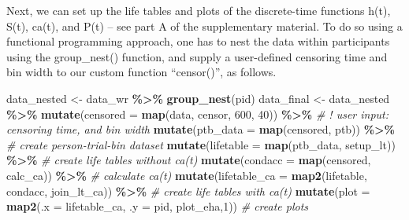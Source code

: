 \documentclass[
  man,floatsintext]{apa6}
\newenvironment{Shaded}{\begin{snugshade}}{\end{snugshade}}
\newcommand{\AttributeTok}[1]{\textcolor[rgb]{0.13,0.29,0.53}{#1}}
\newcommand{\CommentTok}[1]{\textcolor[rgb]{0.56,0.35,0.01}{\textit{#1}}}
\newcommand{\DecValTok}[1]{\textcolor[rgb]{0.00,0.00,0.81}{#1}}
\newcommand{\FunctionTok}[1]{\textcolor[rgb]{0.13,0.29,0.53}{\textbf{#1}}}
\newcommand{\NormalTok}[1]{#1}
\newcommand{\OtherTok}[1]{\textcolor[rgb]{0.56,0.35,0.01}{#1}}
\newcommand{\SpecialCharTok}[1]{\textcolor[rgb]{0.81,0.36,0.00}{\textbf{#1}}}
\begin{document}
\normalsize

Next, we can set up the life tables and plots of the discrete-time functions h(t), S(t), ca(t), and P(t) -- see part A of the supplementary material. To do so using a functional programming approach, one has to nest the data within participants using the group\_nest() function, and supply a user-defined censoring time and bin width to our custom function ``censor()'', as follows.

\scriptsize

\begin{Shaded}
\begin{Highlighting}[]
\NormalTok{data\_nested }\OtherTok{\textless{}{-}}\NormalTok{ data\_wr }\SpecialCharTok{\%\textgreater{}\%} \FunctionTok{group\_nest}\NormalTok{(pid)}
\NormalTok{data\_final }\OtherTok{\textless{}{-}}\NormalTok{ data\_nested }\SpecialCharTok{\%\textgreater{}\%} 
  \FunctionTok{mutate}\NormalTok{(}\AttributeTok{censored  =} \FunctionTok{map}\NormalTok{(data, censor, }\DecValTok{600}\NormalTok{, }\DecValTok{40}\NormalTok{)) }\SpecialCharTok{\%\textgreater{}\%}   \CommentTok{\# ! user input: censoring time, and bin width}
  \FunctionTok{mutate}\NormalTok{(}\AttributeTok{ptb\_data  =} \FunctionTok{map}\NormalTok{(censored, ptb)) }\SpecialCharTok{\%\textgreater{}\%}           \CommentTok{\# create person{-}trial{-}bin dataset}
  \FunctionTok{mutate}\NormalTok{(}\AttributeTok{lifetable =} \FunctionTok{map}\NormalTok{(ptb\_data, setup\_lt)) }\SpecialCharTok{\%\textgreater{}\%}      \CommentTok{\# create life tables without ca(t)}
  \FunctionTok{mutate}\NormalTok{(}\AttributeTok{condacc   =} \FunctionTok{map}\NormalTok{(censored, calc\_ca)) }\SpecialCharTok{\%\textgreater{}\%}       \CommentTok{\# calculate ca(t)}
  \FunctionTok{mutate}\NormalTok{(}\AttributeTok{lifetable\_ca =} \FunctionTok{map2}\NormalTok{(lifetable, condacc, join\_lt\_ca)) }\SpecialCharTok{\%\textgreater{}\%}    \CommentTok{\# create life tables with ca(t)}
  \FunctionTok{mutate}\NormalTok{(}\AttributeTok{plot      =} \FunctionTok{map2}\NormalTok{(}\AttributeTok{.x =}\NormalTok{ lifetable\_ca, }\AttributeTok{.y =}\NormalTok{ pid, plot\_eha,}\DecValTok{1}\NormalTok{))  }\CommentTok{\# create plots }
\end{Highlighting}
\end{Shaded}

\normalsize
\end{document}
